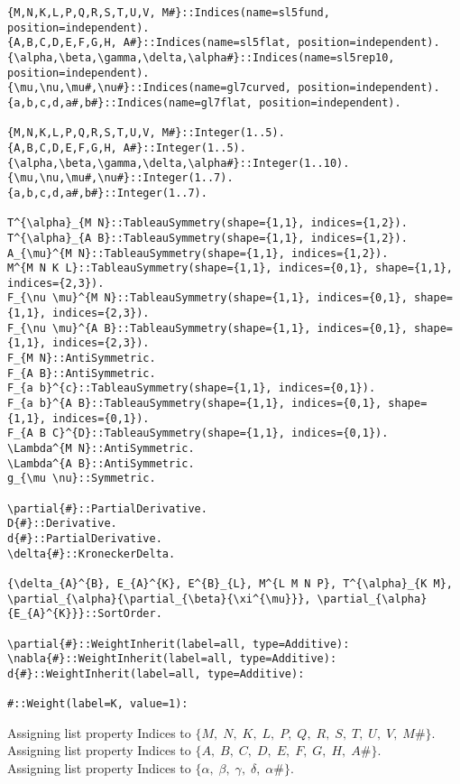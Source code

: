 \documentclass[11pt]{article}
\begin{document}
{\color[named]{Blue}\begin{verbatim}
{M,N,K,L,P,Q,R,S,T,U,V, M#}::Indices(name=sl5fund, position=independent).
{A,B,C,D,E,F,G,H, A#}::Indices(name=sl5flat, position=independent).
{\alpha,\beta,\gamma,\delta,\alpha#}::Indices(name=sl5rep10, position=independent).
{\mu,\nu,\mu#,\nu#}::Indices(name=gl7curved, position=independent).
{a,b,c,d,a#,b#}::Indices(name=gl7flat, position=independent).

{M,N,K,L,P,Q,R,S,T,U,V, M#}::Integer(1..5).
{A,B,C,D,E,F,G,H, A#}::Integer(1..5).
{\alpha,\beta,\gamma,\delta,\alpha#}::Integer(1..10).
{\mu,\nu,\mu#,\nu#}::Integer(1..7).
{a,b,c,d,a#,b#}::Integer(1..7).

T^{\alpha}_{M N}::TableauSymmetry(shape={1,1}, indices={1,2}).
T^{\alpha}_{A B}::TableauSymmetry(shape={1,1}, indices={1,2}).
A_{\mu}^{M N}::TableauSymmetry(shape={1,1}, indices={1,2}).
M^{M N K L}::TableauSymmetry(shape={1,1}, indices={0,1}, shape={1,1}, indices={2,3}).
F_{\nu \mu}^{M N}::TableauSymmetry(shape={1,1}, indices={0,1}, shape={1,1}, indices={2,3}).
F_{\nu \mu}^{A B}::TableauSymmetry(shape={1,1}, indices={0,1}, shape={1,1}, indices={2,3}).
F_{M N}::AntiSymmetric.
F_{A B}::AntiSymmetric.
F_{a b}^{c}::TableauSymmetry(shape={1,1}, indices={0,1}).
F_{a b}^{A B}::TableauSymmetry(shape={1,1}, indices={0,1}, shape={1,1}, indices={0,1}).
F_{A B C}^{D}::TableauSymmetry(shape={1,1}, indices={0,1}).
\Lambda^{M N}::AntiSymmetric.
\Lambda^{A B}::AntiSymmetric.
g_{\mu \nu}::Symmetric.

\partial{#}::PartialDerivative.
D{#}::Derivative.
d{#}::PartialDerivative.
\delta{#}::KroneckerDelta.

{\delta_{A}^{B}, E_{A}^{K}, E^{B}_{L}, M^{L M N P}, T^{\alpha}_{K M},  \partial_{\alpha}{\partial_{\beta}{\xi^{\mu}}}, \partial_{\alpha}{E_{A}^{K}}}::SortOrder.

\partial{#}::WeightInherit(label=all, type=Additive):
\nabla{#}::WeightInherit(label=all, type=Additive):
d{#}::WeightInherit(label=all, type=Additive):

#::Weight(label=K, value=1):
\end{verbatim}}
Assigning list property Indices to $\{M,\; N,\; K,\; L,\; P,\; Q,\; R,\; S,\; T,\; U,\; V,\; M\#\}$.
\\
Assigning list property Indices to $\{A,\; B,\; C,\; D,\; E,\; F,\; G,\; H,\; A\#\}$.
\\
Assigning list property Indices to $\{\alpha,\; \beta,\; \gamma,\; \delta,\; \alpha\#\}$.
\end{document}
